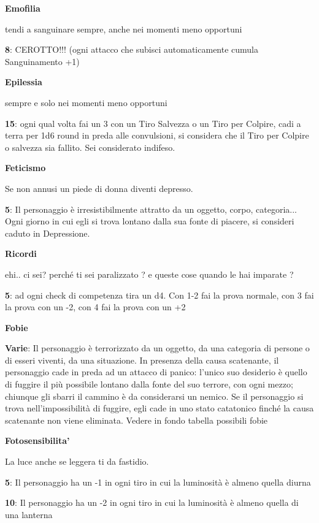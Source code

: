 \documentclass[a4paper,11pt,twoside,openany]{book}
\begin{document}
{\textbf{Emofilia}

tendi a sanguinare sempre, anche nei momenti meno opportuni

\textbf{8}: CEROTTO!!! (ogni attacco che subisci automaticamente cumula Sanguinamento +1)

\textbf{Epilessia}

sempre e solo nei momenti meno opportuni

\textbf{15}: ogni qual volta fai un 3 con un Tiro Salvezza o un Tiro per Colpire, cadi a terra per 1d6 round in preda alle convulsioni, si considera che il Tiro per Colpire o salvezza sia fallito. Sei considerato indifeso.

\textbf{Feticismo}

Se non annusi un piede di donna diventi depresso.

\textbf{5}: Il personaggio è irresistibilmente attratto da un oggetto, corpo, categoria... Ogni giorno in cui egli si trova lontano dalla sua fonte di piacere, si consideri caduto in Depressione.

\textbf{Ricordi}

ehi.. ci sei? perché ti sei paralizzato ? e queste cose quando le hai imparate ?

\textbf{5}: ad ogni check di competenza tira un d4. Con 1-2 fai la prova normale, con 3 fai la prova con un -2, con 4 fai la prova con un +2

\textbf{Fobie}

\textbf{Varie}: Il personaggio è terrorizzato da un oggetto, da una categoria di persone o di esseri viventi, da una situazione. In presenza della causa scatenante, il personaggio cade in preda ad un attacco di panico: l'unico suo desiderio è quello di fuggire il più possibile lontano dalla fonte del suo terrore, con ogni mezzo; chiunque gli sbarri il cammino è da considerarsi un nemico. Se il personaggio si trova nell'impossibilità di fuggire, egli cade in uno stato catatonico finché la causa scatenante non viene eliminata. Vedere in fondo tabella possibili fobie

\textbf{Fotosensibilita'}

La luce anche se leggera ti da fastidio.

\textbf{5}: Il personaggio ha un -1 in ogni tiro in cui la luminosità è almeno quella diurna

\textbf{10}: Il personaggio ha un -2 in ogni tiro in cui la luminosità è almeno quella di una lanterna

}
\end{document}
